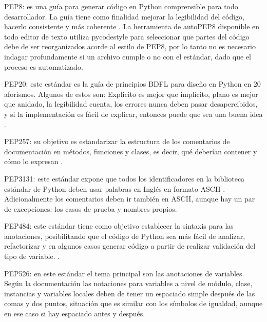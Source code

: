 \begin{APAitemize}
    \item PEP8: es una guía para generar código en Python comprensible para todo desarrollador. La guía tiene como finalidad mejorar la legibilidad del código, hacerlo consistente y más coherente \parencite{PEP8Python}. La herramienta de autoPEP8 disponible en todo editor de texto utiliza pycodestyle para seleccionar que partes del código debe de ser reorganizados acorde al estilo de PEP8, por lo tanto no es necesario indagar profundamente si un archivo cumple o no con el estándar, dado que el proceso es automatizado. 
    \item PEP20: este estándar es la guía de principios BDFL para diseño en Python en 20 aforismos. Algunos de estos son: Explicito es mejor que implícito, plano es mejor que anidado, la legibilidad cuenta, los errores nunca deben pasar desapercibidos, y si la implementación es fácil de explicar, entonces puede que sea una buena idea \parencite{PEP20Python}. 
    \item PEP257: su objetivo es estandarizar la estructura de los comentarios de documentación en métodos, funciones y clases, es decir, qué deberían contener y cómo lo expresan \parencite{PEP257Python}.
    \item PEP3131: este estándar expone que todos los identificadores en la biblioteca estándar de Python deben usar palabras en Inglés en formato ASCII \parencite{PEP3131Python}. Adicionalmente los comentarios deben ir también en ASCII, aunque hay un par de excepciones: los casos de prueba y nombres propios.
    \item PEP484: este estándar tiene como objetivo establecer la sintaxis para las anotaciones, posibilitando que el código de Python sea más fácil de analizar, refactorizar y en algunos casos generar código a partir de realizar validación del tipo de variable. \parencite{PEP484Python}.
    \item PEP526: en este estándar el tema principal son las anotaciones de variables. Según la documentación \parencite{PEP526Python} las notaciones para variables a nivel de módulo, clase, instancias y variables locales deben de tener un espaciado simple después de las comas y dos puntos, situación que es similar con los símbolos de igualdad, aunque en ese caso si hay espaciado antes y después. 
\end{APAitemize}


